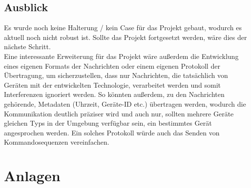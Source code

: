 \documentclass[a4paper, 11pt]{scrartcl}
\begin{document}
\subsection{Ausblick}
Es wurde noch keine Halterung / kein Case für das Projekt gebaut, wodurch es aktuell noch nicht robust ist. Sollte das Projekt fortgesetzt werden, wäre dies der nächste Schritt.
\\
Eine interessante Erweiterung für das Projekt wäre außerdem die Entwicklung eines eigenen Formats der Nachrichten oder einem eigenen Protokoll der Übertragung, 
um sicherzustellen, dass nur Nachrichten, die tatsächlich von Geräten mit der entwickelten Technologie, verarbeitet werden und somit Interferenzen ignoriert werden.
So könnten außerdem, zu den Nachrichten gehörende, Metadaten (Uhrzeit, Geräte-ID etc.) übertragen werden, wodurch die Kommunikation deutlich präziser wird und auch nur,
sollten mehrere Geräte gleichen Typs in der Umgebung verfügbar sein, ein bestimmtes Gerät angesprochen werden. Ein solches Protokoll würde auch das Senden von Kommandosequenzen
vereinfachen.


\newpage
\section{Anlagen}
\end{document}
